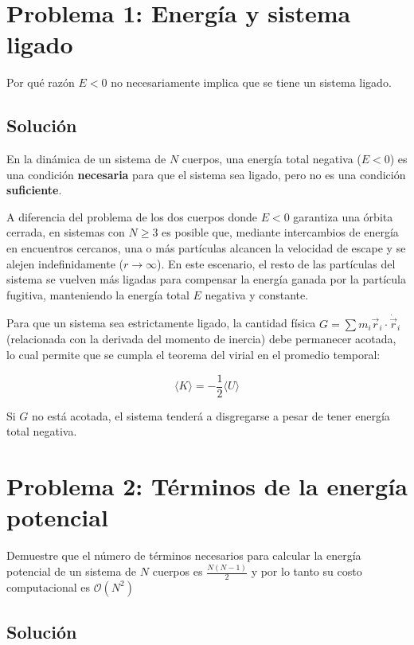 \documentclass[a4paper]{article}
\begin{document}
\section{Problema 1: Energía y sistema ligado}
Por qué razón $E<0$ no necesariamente implica que se tiene un sistema ligado.

\subsection{Solución}

En la dinámica de un sistema de $N$ cuerpos, una energía total negativa ($E < 0$) es una condición \textbf{necesaria} para que el sistema sea ligado, pero no es una condición \textbf{suficiente}. 

A diferencia del problema de los dos cuerpos donde $E < 0$ garantiza una órbita cerrada, en sistemas con $N \geq 3$ es posible que, mediante intercambios de energía en encuentros cercanos, una o más partículas alcancen la velocidad de escape y se alejen indefinidamente ($r \to \infty$). En este escenario, el resto de las partículas del sistema se vuelven más ligadas para compensar la energía ganada por la partícula fugitiva, manteniendo la energía total $E$ negativa y constante.

Para que un sistema sea estrictamente ligado, la cantidad física $G = \sum m_i \vec{r}_i \cdot \dot{\vec{r}}_i$ (relacionada con la derivada del momento de inercia) debe permanecer acotada, lo cual permite que se cumpla el teorema del virial en el promedio temporal:

$$ \langle K \rangle = -\frac{1}{2} \langle U \rangle $$

Si $G$ no está acotada, el sistema tenderá a disgregarse a pesar de tener energía total negativa.




\section{Problema 2: Términos de la energía potencial}

Demuestre que el número de términos necesarios para calcular la energía potencial de un sistema de $N$ cuerpos es $\frac{N(N-1)}{2}$ y por lo tanto su costo computacional es $\mathcal{O}(N^2)$

\subsection{Solución}
\end{document}

